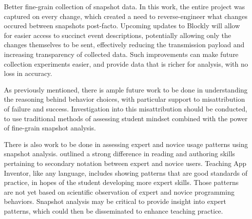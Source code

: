 Better fine-grain collection of snapshot data. In this work, the entire project was captured on every change, which created a need to reverse-engineer what changes occured between snapshots post-facto. Upcoming updates to Blockly will allow for easier access to succinct event descriptions, potentially allowing only the changes themselves to be sent, effectively reducing the transmission payload and increasing transparency of collected data. Such improvements can make future collection experiments easier, and provide data that is richer for analysis, with no loss in accuracy. 

As previously mentioned, there is ample future work to be done in understanding the reasoning behind behavior choices, with particular support to misattribution of failure and success. Investigation into this misattribution should be conducted, to use traditional methods of assessing student mindset combined with the power of fine-grain snapshot analysis. 

There is also work to be done in assessing expert and novice usage patterns using snapshot analysis. \cite{petre-1995} outlined a strong difference in reading and authoring skills pertaining to secondary notation between expert and novice users. Teaching App Inventor, like any language, includes showing patterns that are good standards of practice, in hopes of the student developing more expert skills. Those patterns are not yet based on scientific observation of expert and novice programming behaviors. Snapshot analysis may be critical to provide insight into expert patterns, which could then be disseminated to enhance teaching practice. 

